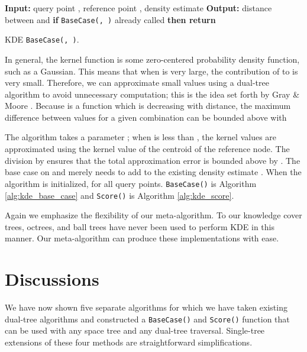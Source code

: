 \documentclass{article}
\begin{document}
\begin{algorithm}[b!]
  \begin{algorithmic}
    \STATE \textbf{Input:} query point , reference point , density
estimate 
    \STATE \textbf{Output:} distance between  and 
    \medskip
    \STATE \textbf{if} \texttt{BaseCase(, )} already called
\textbf{then return}
    \STATE 
    \RETURN 
  \end{algorithmic}
  \caption{KDE \texttt{BaseCase(, )}.}
  \label{alg:kde_base_case}
\end{algorithm}

In general, the kernel function is some zero-centered probability density
function, such as a Gaussian.  This means that when  is very
large, the contribution of  to  is very small.  Therefore, we can
approximate small values using a dual-tree algorithm to avoid unnecessary
computation; this is the idea set forth by Gray \& Moore .
Because  is a function which is decreasing with distance, the maximum
difference between  values for a given combination  can be bounded above with

\vspace*{-2.3em}

\vspace*{-2.3em}

The algorithm takes a parameter ; when  is less than , the kernel
values are approximated using the kernel value of the centroid  of the
reference node.  The division by  ensures that the total approximation
error is bounded above by .  The base case on  and  merely
needs to add  to the existing density estimate .
When the algorithm is initialized,  for all query points.
\texttt{BaseCase()} is Algorithm \ref{alg:kde_base_case} and
\texttt{Score()} is Algorithm \ref{alg:kde_score}.


\vspace*{-0.3em}
Again we emphasize the flexibility of our meta-algorithm.  To our knowledge
cover trees, octrees, and ball trees have never been used to perform
KDE in this manner.  Our meta-algorithm can produce these implementations with
ease.


\vspace*{-1.1em}
\section{Discussions}
\label{sec:discussion}

\vspace*{-0.2em}
We have now shown five separate algorithms for which we have taken existing
dual-tree algorithms and constructed a \texttt{BaseCase()} and \texttt{Score()}
function that can be used with any space tree and any dual-tree traversal.
Single-tree extensions of these four methods are straightforward
simplifications.
\end{document}
